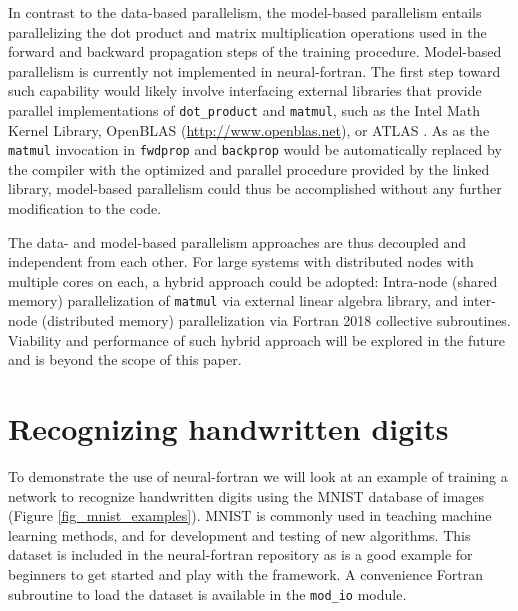 \documentclass[sigplan, review=false, screen=true, balance=true]{acmart}
\begin{document}
In contrast to the data-based parallelism, the model-based parallelism entails
parallelizing the dot product and matrix multiplication operations used in
the forward and backward propagation steps of the training procedure.
Model-based parallelism is currently not implemented in neural-fortran.
The first step toward such capability would likely involve interfacing
external libraries that provide parallel implementations of
\lstinline{dot_product} and \lstinline{matmul}, such as the Intel Math Kernel
Library, OpenBLAS (\url{http://www.openblas.net}), or ATLAS \citep{whaley01, whaley04}.
As as the \lstinline{matmul} invocation in \lstinline{fwdprop} and
\lstinline{backprop} would be automatically replaced by the compiler with the
optimized and parallel procedure provided by the linked library, model-based
parallelism could thus be accomplished without any further modification to
the code.

The data- and model-based parallelism approaches are thus decoupled and
independent from each other. For large systems with distributed nodes with
multiple cores on each, a hybrid approach could be adopted: Intra-node (shared memory)
parallelization of \lstinline{matmul} via external linear algebra library,
and inter-node (distributed memory) parallelization via Fortran 2018 collective
subroutines. Viability and performance of such hybrid approach will be explored
in the future and is beyond the scope of this paper.

\section{Recognizing handwritten digits} \label{section_examples}

To demonstrate the use of neural-fortran we will look at an example of training
a network to recognize handwritten digits using the MNIST database of images
\citep{lecun98} (Figure \ref{fig_mnist_examples}). MNIST is commonly used in
teaching machine learning methods, and for development and testing of new algorithms.
This dataset is included in the neural-fortran repository as is a good example
for beginners to get started and play with the framework.
A convenience Fortran subroutine to load the dataset
is available in the \lstinline{mod_io} module.
\end{document}
